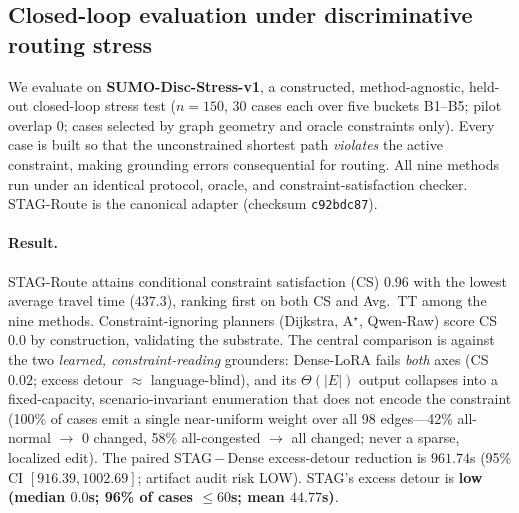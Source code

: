\subsection{Closed-loop evaluation under discriminative routing stress}
\label{sec:closedloop}

We evaluate on \textbf{SUMO-Disc-Stress-v1}, a constructed, method-agnostic, held-out closed-loop
stress test ($n{=}150$, 30 cases each over five buckets B1--B5; pilot overlap $0$; cases selected by
graph geometry and oracle constraints only). Every case is built so that the unconstrained shortest
path \emph{violates} the active constraint, making grounding errors consequential for routing. All
nine methods run under an identical protocol, oracle, and constraint-satisfaction checker.
STAG-Route is the canonical adapter (checksum \texttt{c92bdc87}).


\paragraph{Result.}
STAG-Route attains conditional constraint satisfaction (CS) $\mathbf{0.96}$ with the lowest average
travel time ($437.3$), ranking first on both CS and Avg.\ TT among the nine methods. Constraint-ignoring
planners (Dijkstra, A$^\star$, Qwen-Raw) score CS $0.0$ by construction, validating the substrate. The
central comparison is against the two \emph{learned, constraint-reading} grounders: Dense-LoRA fails
\emph{both} axes (CS $0.02$; excess detour $\approx$ language-blind), and its $\Theta(|E|)$ output
collapses into a fixed-capacity, scenario-invariant enumeration that does not encode the constraint
(100\% of cases emit a single near-uniform weight over all 98 edges---42\% all-normal $\to$ 0 changed,
58\% all-congested $\to$ all changed; never a sparse, localized edit). The
paired STAG\,$-$\,Dense excess-detour reduction is $961.74$s (95\% CI $[916.39,1002.69]$; artifact audit
risk LOW). STAG's excess detour is \textbf{low (median $0.0$s; 96\% of cases $\le 60$s; mean $44.77$s)}.


